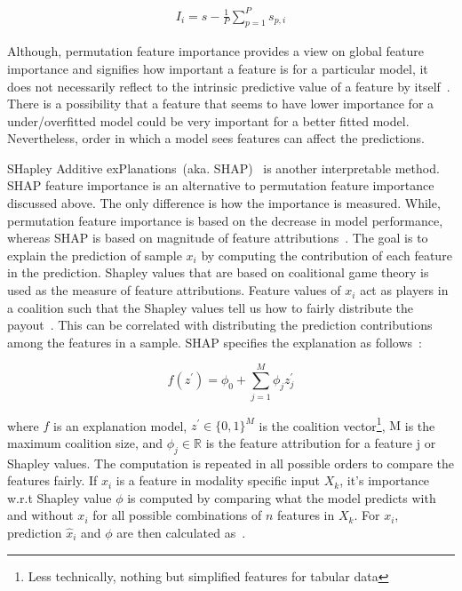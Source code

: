 \vspace{-2mm}
\begin{align}
    I_{i}=s-\frac{1}{P} \sum_{p=1}^{P} s_{p,i}
\end{align}
\fi 

\hspace*{3.5mm} Although, permutation feature importance provides a view on global feature importance and signifies how important a feature is for a particular model, it does not necessarily reflect to the intrinsic predictive value of a feature by itself~\cite{molnar2019interpretable}. There is a possibility that a feature that seems to have lower importance for a under/overfitted model could be very important for a better fitted model. Nevertheless, order in which a model sees features can affect the predictions.

\hspace*{3.5mm} SHapley Additive exPlanations~(aka. SHAP)~\cite{SHAP} is another interpretable method. SHAP feature importance is an alternative to permutation feature importance discussed above. The only difference is how the importance is measured. While, permutation feature importance is based on the decrease in model performance, whereas SHAP is based on magnitude of feature attributions~\cite{molnar2019interpretable}. The goal is to explain the prediction of sample $x_i$ by computing the contribution of each feature in the prediction. Shapley values that are based on coalitional game theory is used as the measure of feature attributions. Feature values of $x_i$ act as players in a coalition such that the Shapley values tell us how to fairly distribute the  payout~\cite{molnar2019interpretable}. This can be correlated with distributing the prediction contributions among the features in a sample. SHAP specifies the explanation as follows~\cite{molnar2019interpretable}:

\begin{equation}
    f\left(z^{\prime}\right)=\phi_{0}+\sum_{j=1}^{M} \phi_{j} z_{j}^{\prime}
\end{equation}

\hspace*{3.5mm} where $f$ is an explanation model, $z^{\prime} \in\{0,1\}^{M}$ is the coalition vector\footnote{Less technically, nothing but simplified features for tabular data}, $\mathrm{M}$ is the maximum coalition size, and $\phi_{j} \in \mathbb{R}$ is the feature attribution for a feature $\mathrm{j}$ or Shapley values. The computation is repeated in all possible orders to compare the features fairly. If $x_i$ is a feature in modality specific input $X_k$, it's importance w.r.t Shapley value $\phi$ is computed by comparing what the model predicts with and without $x_i$ for all possible combinations of $n$ features in $X_k$. For $x_i$, prediction $\hat x_i$ and $\phi$ are then calculated as~\cite{NIPS2017_7062}. 

